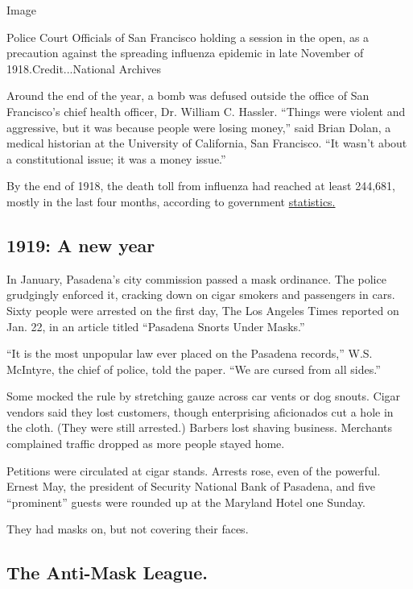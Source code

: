 Image

Police Court Officials of San Francisco holding a session in the open,
as a precaution against the spreading influenza epidemic in late
November of 1918.Credit...National Archives

Around the end of the year, a bomb was defused outside the office of San
Francisco's chief health officer, Dr. William C. Hassler. ``Things were
violent and aggressive, but it was because people were losing money,''
said Brian Dolan, a medical historian at the University of California,
San Francisco. ``It wasn't about a constitutional issue; it was a money
issue.''

By the end of 1918, the death toll from influenza had reached at least
244,681, mostly in the last four months, according to government
\href{https://www.cdc.gov/nchs/data/vsushistorical/mortstatsh_1918.pdf}{statistics.}

\hypertarget{1919-a-new-year}{%
\subsection{1919: A new year}\label{1919-a-new-year}}

In January, Pasadena's city commission passed a mask ordinance. The
police grudgingly enforced it, cracking down on cigar smokers and
passengers in cars. Sixty people were arrested on the first day, The Los
Angeles Times reported on Jan. 22, in an article titled ``Pasadena
Snorts Under Masks.''

``It is the most unpopular law ever placed on the Pasadena records,''
W.S. McIntyre, the chief of police, told the paper. ``We are cursed from
all sides.''

Some mocked the rule by stretching gauze across car vents or dog snouts.
Cigar vendors said they lost customers, though enterprising aficionados
cut a hole in the cloth. (They were still arrested.) Barbers lost
shaving business. Merchants complained traffic dropped as more people
stayed home.

Petitions were circulated at cigar stands. Arrests rose, even of the
powerful. Ernest May, the president of Security National Bank of
Pasadena, and five ``prominent'' guests were rounded up at the Maryland
Hotel one Sunday.

They had masks on, but not covering their faces.

\hypertarget{the-anti-mask-league}{%
\subsection{The Anti-Mask League.}\label{the-anti-mask-league}}

